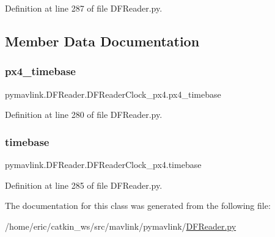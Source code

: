 Definition at line 287 of file D\+F\+Reader.\+py.



\subsection{Member Data Documentation}
\mbox{\label{classpymavlink_1_1DFReader_1_1DFReaderClock__px4_a20353e6a66bef53c589cdaaf1c938503}} 
\subsubsection{\texorpdfstring{px4\_timebase}{px4\_timebase}}
{\footnotesize\ttfamily pymavlink.\+D\+F\+Reader.\+D\+F\+Reader\+Clock\+\_\+px4.\+px4\+\_\+timebase}



Definition at line 280 of file D\+F\+Reader.\+py.

\mbox{\label{classpymavlink_1_1DFReader_1_1DFReaderClock__px4_abfe9c98727c4af5af57c7443f9d45382}} 
\subsubsection{\texorpdfstring{timebase}{timebase}}
{\footnotesize\ttfamily pymavlink.\+D\+F\+Reader.\+D\+F\+Reader\+Clock\+\_\+px4.\+timebase}



Definition at line 285 of file D\+F\+Reader.\+py.



The documentation for this class was generated from the following file\+:\begin{DoxyCompactItemize}
\item 
/home/eric/catkin\+\_\+ws/src/mavlink/pymavlink/\mbox{\hyperlink{DFReader_8py}{D\+F\+Reader.\+py}}\end{DoxyCompactItemize}
